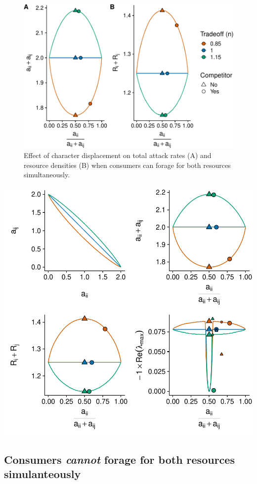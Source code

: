 \documentclass[11pt,]{article}
\begin{document}
\begin{figure}
\centering
\includegraphics{manuscript_ECD_model_files/figure-latex/MacArthur_Resources-1.pdf}
\caption{\label{fig:MacArthur_Resources}Effect of character displacement
on total attack rates (A) and resource densities (B) when consumers can
forage for both resources simultaneously.}
\end{figure}

\includegraphics{Figure_ECD_MacArthur.pdf}

\subsection{\texorpdfstring{Consumers \emph{cannot} forage for both
resources
simulanteously}{Consumers cannot forage for both resources simulanteously}}\label{consumers-cannot-forage-for-both-resources-simulanteously}
\end{document}
